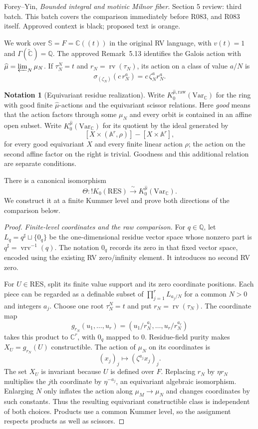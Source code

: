 \documentclass[12pt]{amsart}
\theoremstyle{remark}
\theoremstyle{definition}
\newtheorem{nota}[lem]{Notation}
\newcommand{\C}{\mathds{C}}
\newcommand{\Q}{\mathds{Q}}
\newcommand{\rv}{\operatorname{rv}}
\newcommand{\RES}{\mathrm{RES}}
\newcommand{\vrv}{\operatorname{vrv}}
\newcommand{\Sbase}{\mathbb S}
\numberwithin{equation}{section}
\newcommand{\A}{\mathds{A}}
\newcommand{\Var}{\mathrm{Var}}
\newcommand{\Bangres}{{!K_0(\RES)}}
\newcommand{\Kraw}{K_0^{\widehat\mu,\mathrm{raw}}(\Var_{\C})}
\newcommand{\Kmon}{K_0^{\widehat\mu}(\Var_{\C})}
\begin{document}
\setcounter{section}{5}
\setcounter{subsection}{1}
\setcounter{lem}{13}
{\small\noindent Forey--Yin, \emph{Bounded integral and motivic Milnor fiber}.
Section 5 review: third batch.
This batch covers the comparison immediately before R083, and R083 itself.
Approved context is black; proposed text is orange.}
\medskip

\noindent We work over $\Sbase=F=\C((t))$ in the original RV language,
with $v(t)=1$ and $\Gamma(\widetilde{\C})=\Q$.
The approved Remark~5.13 identifies the Galois action with
$\widehat\mu=\varprojlim_N\mu_N$. If $\tau_N^N=t$ and
$r_N=\rv(\tau_N)$, its action on a class of value $a/N$ is
\[
 \sigma_{(\zeta_N)}(c\,r_N^a)=c\,\zeta_N^a r_N^a.
\]

{\color{ProposalOrange}
\begin{nota}[Equivariant residue realization]\label{bipo:gdv}
Write $\Kraw$ for the ring with good finite
$\widehat\mu$-actions and the equivariant scissor relations.
Here \emph{good} means that the action factors through some $\mu_N$
and every orbit is contained in an affine open subset.
Write $\Kmon$ for its quotient by the ideal generated by
\[
 [X\times(\A^r,\rho)]-[X\times\A^r],
\]
for every good equivariant $X$ and every finite linear action
$\rho$; the action on the second affine factor on the right is
trivial. Goodness and this additional relation are separate
conditions.

There is a canonical isomorphism
\[
 \Theta:\Bangres\xrightarrow{\ \sim\ }\Kmon .
\]
We construct it at a finite Kummer level and prove both
directions of the comparison below.
\end{nota}

\begin{proof}
\emph{Finite-level coordinates and the raw comparison.}
For $q\in\Q$, let $L_q=q^\sharp\sqcup\{0_q\}$ be the
one-dimensional residue vector space whose nonzero part is
$q^\sharp=\vrv^{-1}(q)$. The notation $0_q$ records its zero
in that fixed vector space, encoded using the existing RV
zero/infinity element. It introduces no second RV zero.

For $U\in\RES$, split its finite value support and its zero
coordinate positions. Each piece can be regarded as a definable
subset of $\prod_{j=1}^r L_{a_j/N}$ for a common $N>0$ and
integers $a_j$. Choose one root $\tau_N^N=t$ and put
$r_N=\rv(\tau_N)$. The coordinate map
\[
 g_{r_N}(u_1,\ldots,u_r)
   =(u_1/r_N^{a_1},\ldots,u_r/r_N^{a_r})
\]
takes this product to $\C^r$, with $0_q$ mapped to $0$.
Residue-field purity makes $X_U=g_{r_N}(U)$ constructible.
The action of $\mu_N$ on its coordinates is
\[
 (x_j)_j\longmapsto(\zeta^{a_j}x_j)_j .
\]
The set $X_U$ is invariant because $U$ is defined over $F$.
Replacing $r_N$ by $\eta r_N$ multiplies the $j$th coordinate
by $\eta^{-a_j}$, an equivariant algebraic isomorphism.
Enlarging $N$ only inflates the action along
$\mu_M\to\mu_N$ and changes coordinates by such constants.
Thus the resulting equivariant constructible class is independent
of both choices. Products use a common Kummer level, so the
assignment respects products as well as scissors.


\end{proof}}
\end{document}
